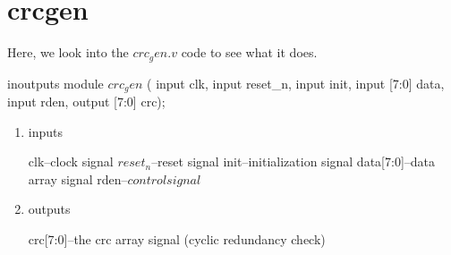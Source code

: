 \chapter{crcgen}

Here, we look into the $crc_gen.v$ code to see what it does.

\begin{chunk}{inoutputs}
  module $crc_gen$
  ( input clk, input reset_n,
    input init,
    input [7:0] data,
    input rden,
    output [7:0] crc);

\end{chunk}

\begin{enumerate}

\item inputs

clk--clock signal
$reset_n$--reset signal
init--initialization signal
data[7:0]--data array signal
rden--$control signal$

\item outputs

crc[7:0]--the crc array signal (cyclic redundancy check)



\end{enumerate}

